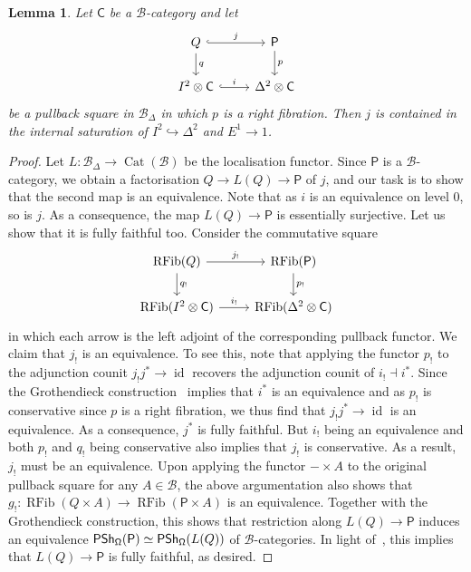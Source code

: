 \documentclass[reqno]{amsart}
\numberwithin{equation}{subsection}
\theoremstyle{plain}
\newtheorem{lemma}[equation]{Lemma}
\theoremstyle{definition}
\let\scr=\mathcal
\let\into=\hookrightarrow
\def\BB{\scr B}
\DeclareMathOperator{\id}{id}
\DeclareMathOperator{\IPSh}{\mathsf{PSh}}
\DeclareMathOperator{\Cat}{Cat}
\DeclareMathOperator{\RFib}{RFib}
\newcommand{\I}[1]{\mathsf{#1}}
\newcommand{\Simp}[1]{#1_{\Delta}}
\begin{document}
\begin{lemma}
	\label{lem:pullbackInnerAnodyneRightFibration}
	Let $\I{C}$ be a $\BB$-category and let
	\begin{equation*}
		\begin{tikzcd}
		Q\arrow[d, "q"]\arrow[r, "j", hookrightarrow] & \I{P}\arrow[d, "p"]\\
		I^2\otimes \I{C}\arrow[r, hookrightarrow, "i"] & \Delta^2\otimes\I{C}
		\end{tikzcd}
	\end{equation*}
	be a pullback square in $\Simp\BB$ in which $p$ is a right fibration. Then $j$ is contained in the internal saturation of $I^2\into\Delta^2$ and $E^1\to 1$.
\end{lemma}
\begin{proof}
	Let $L\colon\Simp\BB\to\Cat(\BB)$ be the localisation functor. Since $\I{P}$ is a $\BB$-category, we obtain a factorisation $Q\to L(Q)\to \I{P}$ of $j$, and our task is to show that the second map is an equivalence. Note that as $i$ is an equivalence on level $0$, so is $j$. As a consequence, the map $L(Q)\to \I{P}$ is essentially surjective. Let us show that it is fully faithful too. Consider the commutative square
	\begin{equation*}
		\begin{tikzcd}
			\RFib(Q)\arrow[r, "j_!"] \arrow[d, "q_!"]& \RFib(\I{P})\arrow[d, "p_!"]\\
			\RFib(I^2\otimes \I{C})\arrow[r, "i_!"] & \RFib(\Delta^2\otimes \I{C})
		\end{tikzcd}
	\end{equation*}
	in which each arrow is the left adjoint of the corresponding pullback functor. We claim that $j_!$ is an equivalence.  To see this, note that applying the functor $p_!$ to the adjunction counit $j_! j^\ast\to\id$ recovers the adjunction counit of $i_!\dashv i^\ast$. Since the Grothendieck construction~\cite[Theorem~4.5.1]{Martini2021} implies that $i^\ast$ is an equivalence and as $p_!$ is conservative since $p$ is a right fibration, we thus find that $j_! j^\ast\to\id$ is an equivalence. As a consequence, $j^\ast$ is fully faithful. But $i_!$ being an equivalence and both $p_!$ and $q_!$ being conservative also implies that $j_!$ is conservative. As a result, $j_!$ must be an equivalence. Upon applying the functor $-\times A$ to the original pullback square for any $A\in\BB$, the above argumentation also shows that $g_!\colon \RFib(Q\times A)\to\RFib(\I{P}\times A)$ is an equivalence. Together with the Grothendieck construction, this shows that restriction along $L(Q)\to \I{P}$ induces an equivalence $\IPSh_{\Univ}(\I{P})\simeq \IPSh_{\Univ}(L(Q))$ of $\BB$-categories. In light of~\cite[Corollary~3.3.3]{Martini2021a}, this implies that $L(Q)\to \I{P}$ is fully faithful, as desired.
\end{proof}
\end{document}
